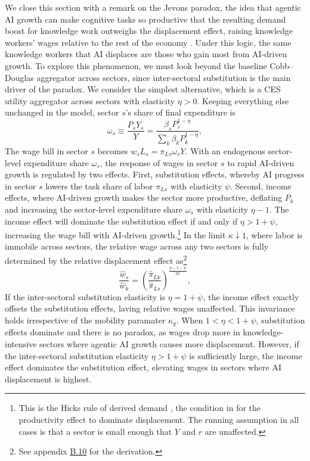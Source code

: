 \documentclass[11pt]{article}
\begin{document}
We close this section with a remark on the Jevons paradox, the idea
that agentic AI growth can make cognitive tasks so productive that
the resulting demand boost for knowledge work outweighs the displacement
effect, raising knowledge workers' wages relative to the rest of the
economy \citep{jevons1865}. Under this logic, the same knowledge
workers that AI displaces are those who gain most from AI-driven growth.
To explore this phenomenon, we must look beyond the baseline Cobb--Douglas
aggregator across sectors, since inter-sectoral substitution is the
main driver of the paradox. We consider the simplest alternative,
which is a CES utility aggregator across sectors with elasticity $\eta>0$.
Keeping everything else unchanged in the model, sector $s$'s share
of final expenditure is
\begin{equation}
\omega_{s}\equiv\frac{P_{s}Y_{s}}{Y}=\frac{\beta_{s}P^{1-\eta}_{s}}{\sum_{k}\beta_{k}P^{1-\eta}_{k}},\label{eq:jevons-share}
\end{equation}
The wage bill in sector $s$ becomes $w_{s}L_{s}=\pi_{Ls}\omega_{s}Y$.
With an endogenous sector-level expenditure share $\omega_{s}$, the
response of wages in sector $s$ to rapid AI-driven growth is regulated
by two effects. First, substitution effects, whereby AI progress in
sector $s$ lowers the task share of labor $\pi_{Ls}$ with elasticity
$\psi$. Second, income effects, where AI-driven growth makes the
sector more productive, deflating $P_{k}$ and increasing the sector-level
expenditure share $\omega_{s}$ with elasticity $\eta-1$. The income
effect will dominate the substitution effect if and only if $\eta>1+\psi$,
increasing the wage bill with AI-driven growth.\footnote{This is the Hicks rule of derived demand \citep{hicks1932}, the condition
in \citet{ar2018} for the productivity effect to dominate displacement.
The running assumption in all cases is that a sector is small enough
that $Y$ and $r$ are unaffected.} In the limit $\kappa\downarrow1$, where labor is immobile across
sectors, the relative wage across any two sectors is fully determined
by the relative displacement effect as\footnote{See appendix \href{https://ahmadlp.github.io/Lashkaripour_AI_Displacement_Online_Appendix.pdf\#page=57}{B.10} for the derivation.}
\begin{equation}
\frac{\hat{w}_{s}}{\hat{w}_{k}}=\left(\frac{\hat{\pi}_{Lk}}{\hat{\pi}_{Ls}}\right)^{\frac{\eta-1-\psi}{\eta\psi}},\label{eq:jevons-ratio}
\end{equation}
If the inter-sectoral substitution elasticity is $\eta=1+\psi$, the
income effect exactly offsets the substitution effects, laving relative
wages unaffected. This invariance holds irrespective of the mobility
paramater $\kappa_{g}$. When $1<\eta<1+\psi$, substitution effects
dominate and there is no paradox, as wages drop more in knowledge-intensive
sectors where agentic AI growth causes more displacement. However,
if the inter-sectoral substitution elasticity $\eta>1+\psi$ is sufficiently
large, the income effect dominates the substitution effect, elevating
wages in sectors where AI displacement is highest.
\end{document}
